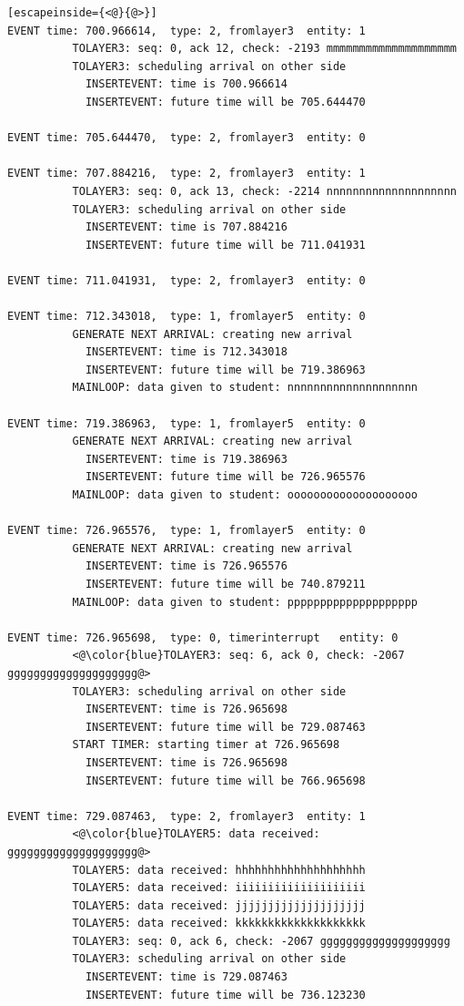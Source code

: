 \documentclass[paper=a4, fontsize=11pt]{scrartcl}
\numberwithin{equation}{section}		%
\numberwithin{figure}{section}			%
\numberwithin{table}{section}				%
\begin{document}
\begin{lstlisting}[escapeinside={<@}{@>}]
EVENT time: 700.966614,  type: 2, fromlayer3  entity: 1
          TOLAYER3: seq: 0, ack 12, check: -2193 mmmmmmmmmmmmmmmmmmmm
          TOLAYER3: scheduling arrival on other side
            INSERTEVENT: time is 700.966614
            INSERTEVENT: future time will be 705.644470

EVENT time: 705.644470,  type: 2, fromlayer3  entity: 0

EVENT time: 707.884216,  type: 2, fromlayer3  entity: 1
          TOLAYER3: seq: 0, ack 13, check: -2214 nnnnnnnnnnnnnnnnnnnn
          TOLAYER3: scheduling arrival on other side
            INSERTEVENT: time is 707.884216
            INSERTEVENT: future time will be 711.041931

EVENT time: 711.041931,  type: 2, fromlayer3  entity: 0

EVENT time: 712.343018,  type: 1, fromlayer5  entity: 0
          GENERATE NEXT ARRIVAL: creating new arrival
            INSERTEVENT: time is 712.343018
            INSERTEVENT: future time will be 719.386963
          MAINLOOP: data given to student: nnnnnnnnnnnnnnnnnnnn

EVENT time: 719.386963,  type: 1, fromlayer5  entity: 0
          GENERATE NEXT ARRIVAL: creating new arrival
            INSERTEVENT: time is 719.386963
            INSERTEVENT: future time will be 726.965576
          MAINLOOP: data given to student: oooooooooooooooooooo

EVENT time: 726.965576,  type: 1, fromlayer5  entity: 0
          GENERATE NEXT ARRIVAL: creating new arrival
            INSERTEVENT: time is 726.965576
            INSERTEVENT: future time will be 740.879211
          MAINLOOP: data given to student: pppppppppppppppppppp

EVENT time: 726.965698,  type: 0, timerinterrupt   entity: 0
          <@\color{blue}TOLAYER3: seq: 6, ack 0, check: -2067 gggggggggggggggggggg@>
          TOLAYER3: scheduling arrival on other side
            INSERTEVENT: time is 726.965698
            INSERTEVENT: future time will be 729.087463
          START TIMER: starting timer at 726.965698
            INSERTEVENT: time is 726.965698
            INSERTEVENT: future time will be 766.965698

EVENT time: 729.087463,  type: 2, fromlayer3  entity: 1
          <@\color{blue}TOLAYER5: data received: gggggggggggggggggggg@>
          TOLAYER5: data received: hhhhhhhhhhhhhhhhhhhh
          TOLAYER5: data received: iiiiiiiiiiiiiiiiiiii
          TOLAYER5: data received: jjjjjjjjjjjjjjjjjjjj
          TOLAYER5: data received: kkkkkkkkkkkkkkkkkkkk
          TOLAYER3: seq: 0, ack 6, check: -2067 gggggggggggggggggggg
          TOLAYER3: scheduling arrival on other side
            INSERTEVENT: time is 729.087463
            INSERTEVENT: future time will be 736.123230


\end{lstlisting}
\end{document}
